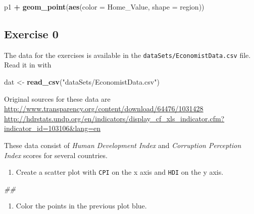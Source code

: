 \documentclass[
]{book}
\newenvironment{Shaded}{\begin{snugshade}}{\end{snugshade}}
\newcommand{\CommentTok}[1]{\textcolor[rgb]{0.56,0.35,0.01}{\textit{#1}}}
\newcommand{\DataTypeTok}[1]{\textcolor[rgb]{0.13,0.29,0.53}{#1}}
\newcommand{\KeywordTok}[1]{\textcolor[rgb]{0.13,0.29,0.53}{\textbf{#1}}}
\newcommand{\NormalTok}[1]{#1}
\newcommand{\OperatorTok}[1]{\textcolor[rgb]{0.81,0.36,0.00}{\textbf{#1}}}
\newcommand{\StringTok}[1]{\textcolor[rgb]{0.31,0.60,0.02}{#1}}
\providecommand{\tightlist}{%
  \setlength{\itemsep}{0pt}\setlength{\parskip}{0pt}}
\begin{document}
\begin{Shaded}
\begin{Highlighting}[]
\NormalTok{p1 }\OperatorTok{+}
\StringTok{  }\KeywordTok{geom_point}\NormalTok{(}\KeywordTok{aes}\NormalTok{(}\DataTypeTok{color =}\NormalTok{ Home_Value, }\DataTypeTok{shape =}\NormalTok{ region))}
\end{Highlighting}
\end{Shaded}

\hypertarget{exercise-0-2}{%
\subsection{Exercise 0}\label{exercise-0-2}}

The data for the exercises is available in the \texttt{dataSets/EconomistData.csv} file. Read it in with

\begin{Shaded}
\begin{Highlighting}[]
\NormalTok{dat <-}\StringTok{ }\KeywordTok{read_csv}\NormalTok{(}\StringTok{"dataSets/EconomistData.csv"}\NormalTok{)}
\end{Highlighting}
\end{Shaded}

Original sources for these data are \url{http://www.transparency.org/content/download/64476/1031428} \url{http://hdrstats.undp.org/en/indicators/display_cf_xls_indicator.cfm?indicator_id=103106\&lang=en}

These data consist of \emph{Human Development Index} and \emph{Corruption Perception Index} scores for several countries.

\begin{enumerate}
\def\labelenumi{\arabic{enumi}.}
\tightlist
\item
  Create a scatter plot with \texttt{CPI} on the x axis and \texttt{HDI} on the y axis.
\end{enumerate}

\begin{Shaded}
\begin{Highlighting}[]
\CommentTok{## }
\end{Highlighting}
\end{Shaded}

\begin{enumerate}
\def\labelenumi{\arabic{enumi}.}
\setcounter{enumi}{1}
\tightlist
\item
  Color the points in the previous plot blue.
\end{enumerate}
\end{document}
